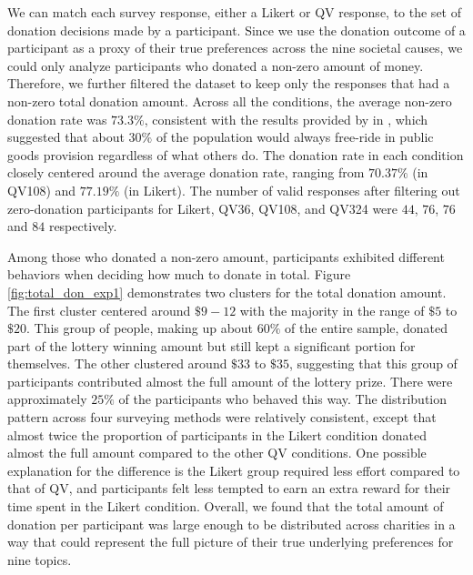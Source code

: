 We can match each survey response,  either a Likert or QV response, to the set of donation decisions made by a participant. Since we use the donation outcome of a participant  as a proxy of their true preferences  across the nine societal causes,  we could only analyze participants who donated a non-zero amount of money. Therefore, we further filtered the dataset  to keep only the responses  that had a non-zero total donation amount. Across all the conditions,  the average non-zero donation rate was $73.3\%$, consistent with the results provided by \textcite{fehr2007human} in \citeyear{fehr2007human}, which suggested that about $30\%$ of the population  would always free-ride in public goods provision  regardless of what others do.  The donation rate in each condition  closely centered around the average donation rate,  ranging from $70.37\%$ (in QV108) and $77.19\%$ (in Likert). The number of valid responses after filtering out zero-donation participants for Likert, QV36, QV108, and QV324 were $44$, $76$, $76$ and $84$ respectively.

Among those who donated a non-zero amount,
participants exhibited different behaviors
when deciding how much to donate in total. 
Figure \ref{fig:total_don_exp1} demonstrates
two clusters for the total donation amount. 
The first cluster centered around $\$9-12$
with the majority in the range of $\$5$ to $\$20$. 
This group of people,
making up about $60\%$ of the entire sample, 
donated part of the lottery winning amount
but still kept a significant portion for themselves.
The other clustered around $\$33$ to $\$35$, 
suggesting that this group of participants
contributed almost the full amount of the lottery prize. 
There were approximately $25\%$ of the participants who behaved this way. 
The distribution pattern across 
four surveying methods were relatively consistent, 
except that almost twice the proportion of participants 
in the Likert condition donated almost the full amount 
compared to the other QV conditions.
One possible explanation for the difference is 
the Likert group required less effort compared to that of QV, 
and participants felt less tempted 
to earn an extra reward for their time spent in the Likert condition. 
Overall, we found that the total amount of donation per participant 
was large enough to be distributed across charities
in a way that could represent the full picture of 
their true underlying preferences for nine topics.

